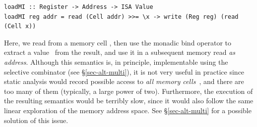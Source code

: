 \vspace{1mm}
\begin{verbatim}
loadMI :: Register -> Address -> ISA Value
loadMI reg addr = read (Cell addr) >>= \x -> write (Reg reg) (read (Cell x))
\end{verbatim}
\vspace{1mm}

\noindent
Here, we read from a memory cell , then use the monadic bind operator
to extract a value~ from the result, and use it in a subsequent memory
read \emph{as address}. Although this semantics is, in principle, implementable
using the selective  combinator (see \S\ref{sec-alt-multi}), it is not
very useful in practice since static analysis would record possible access to
\emph{all memory cells}~, and there are too many of them (typically, a
large power of two). Furthermore, the execution of the resulting semantics would
be terribly slow, since it would also follow the same linear exploration of the
memory address space. See \S\ref{sec-alt-multi} for a possible solution of this
issue.

